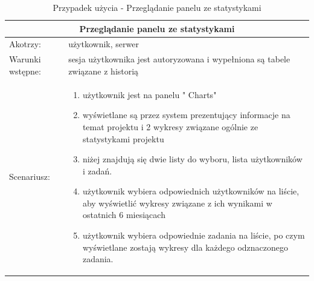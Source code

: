 \begin{table}[h!]
	\begin{tabular}{|p{2cm}||p{13cm}|  }
		
		
		
		\hline
		\multicolumn{2}{|c|}{Przeglądanie panelu ze statystykami} \\
		\hline
		Akotrzy: & użytkownik, serwer \\
		\hline
		Warunki wstępne: & sesja użytkownika jest autoryzowana i wypełniona są tabele związane z historią \\
		\hline
		Scenariusz: &
		\begin{enumerate}
			\item użytkownik jest na panelu " Charts"
			\item wyświetlane są przez system prezentujący informacje na temat projektu i 2 wykresy związane ogólnie ze statystykami projektu
			\item niżej znajdują się dwie listy do wyboru, lista użytkowników i zadań.
			\item użytkownik wybiera odpowiednich użytkowników na liście, aby wyświetlić wykresy związane z ich wynikami w ostatnich 6 miesiącach
			\item użytkownik wybiera odpowiednie zadania na liście, po czym wyświetlane zostają wykresy dla każdego odznaczonego zadania.
		\end{enumerate}\\
		\hline
	\end{tabular}
	\caption{Przypadek użycia - Przeglądanie panelu ze statystykami}
\end{table}


